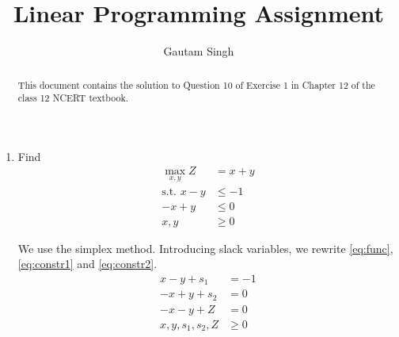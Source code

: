 \documentclass[journal,12pt,twocolumn]{IEEEtran}
\begin{document}
\vspace{3cm}
\title{Linear Programming Assignment}
\author{Gautam Singh}
\maketitle
\bigskip

\begin{abstract}
    This document contains the solution to Question 10 of 
    Exercise 1 in Chapter 12 of the class 12 NCERT textbook.
\end{abstract}

\begin{enumerate}
    \item Find 
    \begin{align}
        \max_{x,y}Z &= x + y \label{eq:func} \\
        \textrm{s.t. } x - y &\le -1 \label{eq:constr1} \\
        -x + y &\le 0 \label{eq:constr2} \\
        x, y &\ge 0
    \end{align}

    \solution We use the simplex method. Introducing slack variables,
    we rewrite \eqref{eq:func}, \eqref{eq:constr1} and \eqref{eq:constr2}.
    \begin{align}
        x - y + s_1 &= -1 \\
        -x + y + s_2 &= 0 \\
        -x - y + Z &= 0 \\
        x, y, s_1, s_2, Z &\ge 0
    \end{align}


\end{enumerate}
\end{document}

